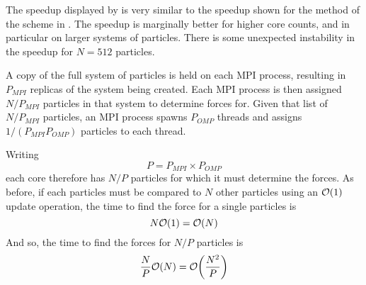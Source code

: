%
%
\begin{figure}[!h]
    
    \caption{
        \vZeroSpeedupCaption
            {\sharedandreplicateddata{}}
            {\pairoperation{}}
    }
    \label{fig:v1_shared_and_replicated_data_pair_operation_speedups}
\end{figure}


\vZeroSpeedupExplanation
    {}
    {\sharedandreplicateddata{}}
    {\pairoperation{}}

The speedup displayed by 
is very similar to the speedup shown for the \pairoperation{}
method of the \replicateddata{} scheme in
.
%
The speedup is marginally better for higher core counts, and in
particular on larger systems of particles.
%
There is some unexpected instability in the speedup for $N=512$ particles.


%
A copy of the full system of particles is held on each MPI process,
resulting in $P_{MPI}$ replicas of the system being created.
%
Each MPI process is then assigned $N/P_{MPI}$ particles in that system
to determine forces for.
%
Given that list of $N/P_{MPI}$ particles,
an MPI process spawns $P_{OMP}$ threads
and assigns $1/(P_{MPI} P_{OMP})$ particles to each thread.

Writing
\begin{equation}
    \label{eqn:p_eq_pmpi_pomp}
    P = P_{MPI} \times{} P_{OMP}
\end{equation}
each core therefore has $N/P$ particles
for which it must determine the forces.
%
As before, if each particles must be compared to $N$ other particles
using an $\mathcal{O}{\left({ 1 }\right)}$ update operation, the time to find the force for
a single particles is
\begin{equation}
    N\mathcal{O}{\left({ 1 }\right)} = \mathcal{O}{\left({ N }\right)}
\end{equation}
And so, the time to find the forces for $N/P$ particles is
\begin{equation}
    \label{eqn:shared_and_replicated_calculation_time}
    \frac{N}{P}\mathcal{O}{\left({ N }\right)} = \mathcal{O}{\left({ \frac{N^2}{P} }\right)}
\end{equation}

